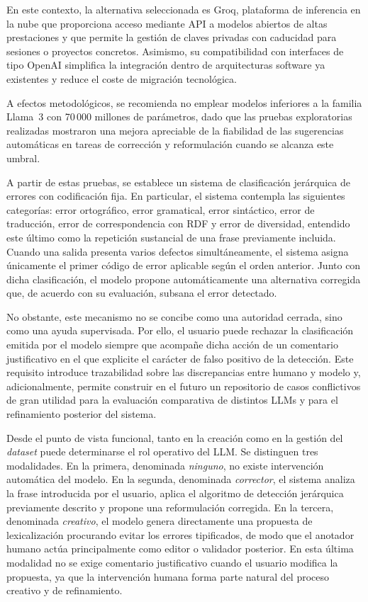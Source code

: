 En este contexto, la alternativa seleccionada es Groq, plataforma de inferencia
en la nube que proporciona acceso mediante API a modelos abiertos de altas
prestaciones y que permite la gestión de claves privadas con caducidad para
sesiones o proyectos concretos. Asimismo, su compatibilidad con interfaces de
tipo OpenAI simplifica la integración dentro de arquitecturas software ya
existentes y reduce el coste de migración tecnológica.

A efectos metodológicos, se recomienda no emplear modelos inferiores a la
familia Llama~3 con 70\,000 millones de parámetros, dado que las pruebas
exploratorias realizadas mostraron una mejora apreciable de la fiabilidad de
las sugerencias automáticas en tareas de corrección y reformulación cuando se
alcanza este umbral.

A partir de estas pruebas, se establece un sistema de clasificación jerárquica
de errores con codificación fija. En particular, el sistema contempla las
siguientes categorías: error ortográfico, error gramatical, error sintáctico,
error de traducción, error de correspondencia con RDF y error de diversidad,
entendido este último como la repetición sustancial de una frase previamente
incluida. Cuando una salida presenta varios defectos simultáneamente, el
sistema asigna únicamente el primer código de error aplicable según el orden
anterior. Junto con dicha clasificación, el modelo propone automáticamente una
alternativa corregida que, de acuerdo con su evaluación, subsana el error
detectado.

No obstante, este mecanismo no se concibe como una autoridad cerrada, sino como
una ayuda supervisada. Por ello, el usuario puede rechazar la clasificación
emitida por el modelo siempre que acompañe dicha acción de un comentario
justificativo en el que explicite el carácter de falso positivo de la
detección. Este requisito introduce trazabilidad sobre las discrepancias entre
humano y modelo y, adicionalmente, permite construir en el futuro un
repositorio de casos conflictivos de gran utilidad para la evaluación
comparativa de distintos LLMs y para el refinamiento posterior del sistema.

Desde el punto de vista funcional, tanto en la creación como en la gestión del
\textit{dataset} puede determinarse el rol operativo del LLM. Se distinguen
tres modalidades. En la primera, denominada \textit{ninguno}, no existe
intervención automática del modelo. En la segunda, denominada
\textit{corrector}, el sistema analiza la frase introducida por el usuario,
aplica el algoritmo de detección jerárquica previamente descrito y propone una
reformulación corregida. En la tercera, denominada \textit{creativo}, el modelo
genera directamente una propuesta de lexicalización procurando evitar los
errores tipificados, de modo que el anotador humano actúa principalmente como
editor o validador posterior. En esta última modalidad no se exige comentario
justificativo cuando el usuario modifica la propuesta, ya que la intervención
humana forma parte natural del proceso creativo y de refinamiento.


